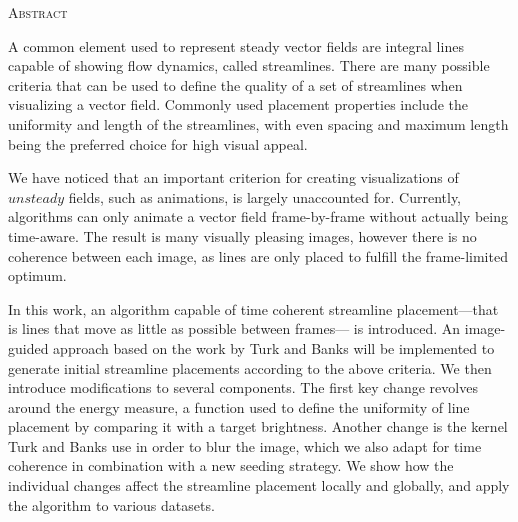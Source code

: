 
\begin{center}
  \textsc{Abstract}
\end{center}
%
\noindent
A common element used to represent steady vector fields are integral lines capable of showing flow dynamics, called streamlines.
There are many possible criteria that can be used to define the quality of a set of streamlines when visualizing a vector field.
Commonly used placement properties include the uniformity and length of the streamlines, with even spacing and maximum length being the preferred choice for high visual appeal.

We have noticed that an important criterion for creating visualizations of $unsteady$ fields, such as animations, is largely unaccounted for.
Currently, algorithms can only animate a vector field frame-by-frame without actually being time-aware.
The result is many visually pleasing images, however there is no coherence between each image, as lines are only placed to fulfill the frame-limited optimum.

In this work, an algorithm capable of time coherent streamline placement---that is lines that move as little as possible between frames--- is introduced.
An image-guided approach based on the work by Turk and Banks will be implemented to generate initial streamline placements according to the above criteria.
We then introduce modifications to several components.
The first key change revolves around the energy measure, a function used to define the uniformity of line placement by comparing it with a target brightness.
Another change is the kernel Turk and Banks use in order to blur the image, which we also adapt for time coherence in combination with a new seeding strategy.
We show how the individual changes affect the streamline placement locally and globally, and apply the algorithm to various datasets.
\cleardoublepage
